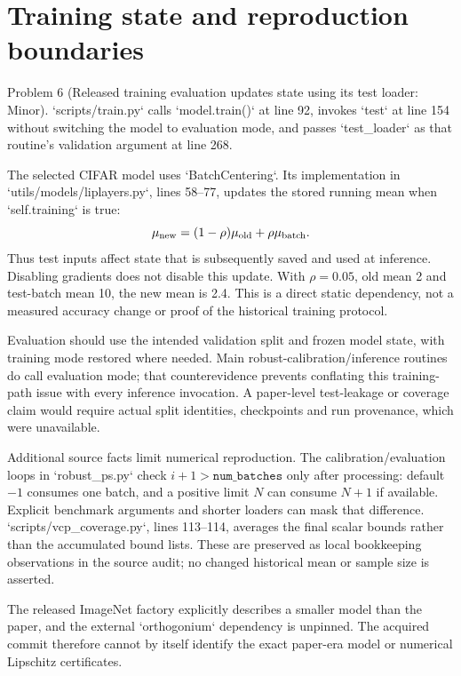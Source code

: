 \documentclass[10pt]{article}
\begin{document}
\section*{Training state and reproduction boundaries}
Problem 6 (Released training evaluation updates state using its test loader: Minor).  `scripts/train.py` calls `model.train()` at line 92, invokes `test` at line 154 without switching the model to evaluation mode, and passes `test\_loader` as that routine’s validation argument at line 268.\par
The selected CIFAR model uses `BatchCentering`. Its implementation in `utils/models/liplayers.py`, lines 58–77, updates the stored running mean when `self.training` is true: \[\mu_{\rm new}=(1-\rho)\mu_{\rm old}+\rho\mu_{\rm batch}.\] Thus test inputs affect state that is subsequently saved and used at inference. Disabling gradients does not disable this update. With \(\rho=0.05\), old mean 2 and test-batch mean 10, the new mean is 2.4. This is a direct static dependency, not a measured accuracy change or proof of the historical training protocol.\par
Evaluation should use the intended validation split and frozen model state, with training mode restored where needed. Main robust-calibration/inference routines do call evaluation mode; that counterevidence prevents conflating this training-path issue with every inference invocation. A paper-level test-leakage or coverage claim would require actual split identities, checkpoints and run provenance, which were unavailable.\par
Additional source facts limit numerical reproduction. The calibration/evaluation loops in `robust\_ps.py` check \(i+1>\texttt{num\_batches}\) only after processing: default \(-1\) consumes one batch, and a positive limit \(N\) can consume \(N+1\) if available. Explicit benchmark arguments and shorter loaders can mask that difference. `scripts/vcp\_coverage.py`, lines 113–114, averages the final scalar bounds rather than the accumulated bound lists. These are preserved as local bookkeeping observations in the source audit; no changed historical mean or sample size is asserted.\par
The released ImageNet factory explicitly describes a smaller model than the paper, and the external `orthogonium` dependency is unpinned. The acquired commit therefore cannot by itself identify the exact paper-era model or numerical Lipschitz certificates.\par
\end{document}
